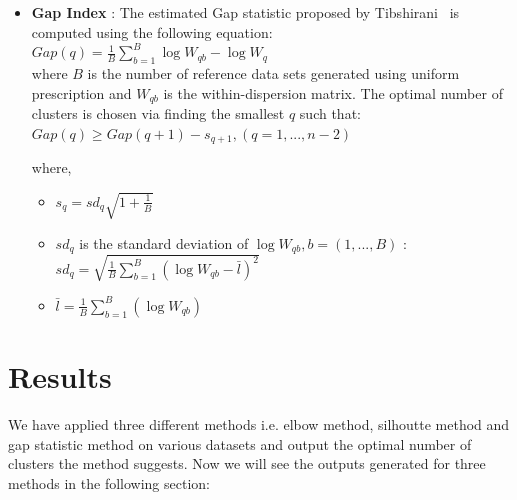 \begin{itemize}
\item \textbf{Gap Index} : The estimated Gap statistic proposed by Tibshirani~\cite{tibshirani01} is
computed using the following equation:\\

$Gap(q) = \frac{1}{B}\sum_{b=1}^{B} \log{W_{qb}} - \log{W_{q}}$\\

where $B$ is the number of reference data sets generated using uniform prescription and $W_{qb}$
is the within-dispersion matrix. The optimal number of clusters is chosen via finding the smallest
$q$ such that:\\

$Gap(q) \geq Gap(q+1) - s_{q+1}, (q = 1, ..., n-2)$

where,

\begin{itemize}
\item $s_{q} = sd_{q} \sqrt{1+\frac{1}{B}}$
\item $sd_{q}$ is the standard deviation of $\log{W_{qb}}, b = (1,...,B)$ : $sd_{q} = \sqrt{\frac{1}{B}\sum_{b=1}^{B}(\log{W_{qb}}-\bar{l})^2}$
\item $\bar{l} = \frac{1}{B}\sum_{b=1}^{B}(\log{W_{qb}}) $
\end{itemize}

\end{itemize}

\section{Results}
We have applied three different methods i.e. elbow method, silhoutte method and gap statistic method on
various datasets and output the optimal number of clusters the method suggests. Now we will see the outputs
generated for three methods in the following section:


